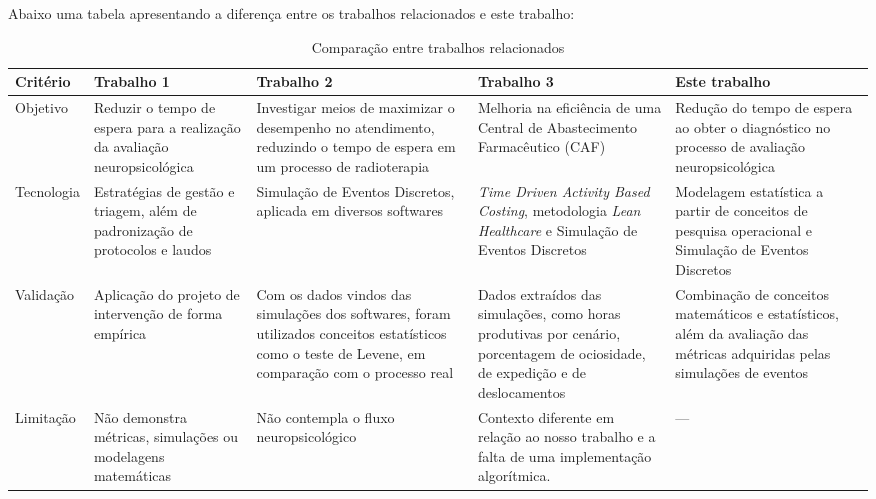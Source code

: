 \documentclass[
    12pt,                %
    openright,           %
    oneside,             %
    a4paper,             %
    english,             %
    brazil               %
]{abntex2}
\begin{document}
Abaixo uma tabela apresentando a diferença entre os trabalhos relacionados e este trabalho:

\begin{table}[H]
    \centering
    \caption{Comparação entre trabalhos relacionados}
    \label{tab:trabalhos_relacionados}
    
    \tiny %
    
    \setlength{\tabcolsep}{4pt} %
    
    \begin{tabularx}{\textwidth}{p{1.5cm}|Y|Y|Y|Y}
        \toprule
        \textbf{Critério} & \textbf{Trabalho 1} & \textbf{Trabalho 2} & \textbf{Trabalho 3} & \textbf{Este trabalho} \\
        \midrule

        Objetivo 
        & Reduzir o tempo de espera para a realização da avaliação neuropsicológica 
        & Investigar meios de maximizar o desempenho no atendimento, reduzindo o tempo de espera em um processo de radioterapia 
				& Melhoria na eficiência de uma Central de Abastecimento Farmacêutico (CAF)
        & Redução do tempo de espera ao obter o diagnóstico no processo de avaliação neuropsicológica \\
        \midrule

        Tecnologia 
        & Estratégias de gestão e triagem, além de padronização de protocolos e laudos
				& Simulação de Eventos Discretos, aplicada em diversos softwares 
				& \textit{Time Driven Activity Based Costing}, metodologia \textit{Lean Healthcare} e Simulação de Eventos Discretos
        & Modelagem estatística a partir de conceitos de pesquisa operacional e Simulação de Eventos Discretos \\
        \midrule

        Validação 
        & Aplicação do projeto de intervenção de forma empírica
        & Com os dados vindos das simulações dos softwares, foram utilizados conceitos estatísticos como o teste de Levene, em comparação com o processo real
        & Dados extraídos das simulações, como horas produtivas por cenário, porcentagem de ociosidade, de expedição e de deslocamentos
        & Combinação de conceitos matemáticos e estatísticos, além da avaliação das métricas adquiridas pelas simulações de eventos \\
        \midrule

        Limitação 
        & Não demonstra métricas, simulações ou modelagens matemáticas
        & Não contempla o fluxo neuropsicológico
        & Contexto diferente em relação ao nosso trabalho e a falta de uma implementação algorítmica.
        & --- \\
        
        \bottomrule
    \end{tabularx}
    
\end{table}
\end{document}
